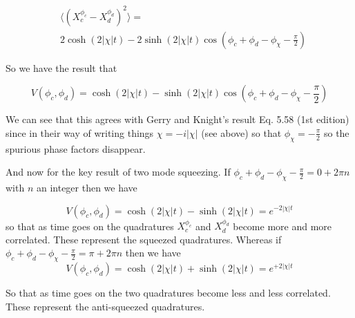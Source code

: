 \documentclass[12pt]{article}
\begin{document}
\begin{align*}
&\langle (X_c^{\phi_c} - X_d^{\phi_d})^2 \rangle = \\
&2\cosh(2|\chi|t) - 2 \sinh(2|\chi|t) \cos(\phi_c+\phi_d-\phi_{\chi}-\frac{\pi}{2})
\end{align*}

So we have the result that

\[
V(\phi_c,\phi_d) = \cosh(2|\chi|t) - \sinh(2|\chi|t)\cos(\phi_c+\phi_d - \phi_{\chi} - \frac{\pi}{2})
\]

We can see that this agrees with Gerry and Knight's result Eq. 5.58 (1st edition) since in their way of writing things $\chi = -i|\chi|$ (see above) so that $\phi_{\chi} = -\frac{\pi}{2}$ so the spurious phase factors disappear.

And now for the key result of two mode squeezing. If $\phi_c+\phi_d-\phi_{\chi} - \frac{\pi}{2}=0+2 \pi n$ with $n$ an integer then we have

\[V(\phi_c,\phi_d) = \cosh(2|\chi|t) - \sinh(2|\chi|t) = e^{-2|\chi|t}\]
so that as time goes on the quadratures $X_c^{\phi_c}$ and $X_d^{\phi_d}$ become more and more correlated. These represent the squeezed quadratures. Whereas if $\phi_c+\phi_d-\phi_{\chi} - \frac{\pi}{2}=\pi+2 \pi n$ then we have 
\[V(\phi_c,\phi_d) = \cosh(2|\chi|t) + \sinh(2|\chi|t) = e^{+2|\chi|t}\]

So that as time goes on the two quadratures become less and less correlated. These represent the anti-squeezed quadratures.
\end{document}
